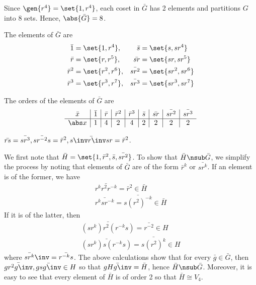 \begin{solenum}
    \item Since $\gen{r^4} = \set{1, r^4}$, each coset in $\bar G$ has 2 elements and partitions $G$ into 8 sets.
	Hence, $\abs{\bar G} = 8$.
    \item The elements of $\bar G$ are
    \begin{align*}
        \bar 1 & = \set{1, r^4}, & \bar{s} & = \set{s, sr^4} \\
        \bar r & = \set{r, r^5}, & \bar{sr} & = \set{sr, sr^5} \\
        \bar r^2 & = \set{r^2, r^6}, & \bar{sr^2} & = \set{sr^2, sr^6} \\
        \bar r^3 & = \set{r^3, r^7}, & \bar{sr^3} & = \set{sr^3, sr^7}
    \end{align*}
    \item The orders of the elements of $\bar G$ are
    \[
        \begin{array}{c|c|c|c|c|c|c|c|c}
            \bar x & \bar 1 & \bar r & \bar r^2 & \bar r^3 & \bar s & \bar{sr} & \bar{sr^2} & \bar{sr^3} \\
            \hline
            \abs x & 1 & 4 & 2 & 4 & 2 & 2 & 2 & 2
        \end{array}
    \]
    \item $\bar{rs} = \bar{sr^3}, \bar{sr^{-2}s} = \bar r^2, \bar{s\inv r\inv sr} = \bar r^2$.
    \item We first note that $\bar H = \set{1, \bar r^2, \bar s, \bar{sr^2}}$.
	To show that $\bar H \nsub \bar G$, we simplify the process by noting that elements of $\bar G$ are of the form $\bar r^k$ or $\bar{sr^k}$.
	If an element is of the former, we have
    \begin{align*}
        \bar{r^kr^2r^{-k}} = \bar r^2 \in \bar H \\
        \bar{r^ksr^{-k}} = \bar{s(r^2)^{-k}} \in \bar H
    \end{align*}
    If it is of the latter, then
    \begin{align*}
        \bar{(sr^k)r^2(r^{-k}s)} = \bar{r^{-2}} \in H \\
        \bar{(sr^k)s(r^{-k}s)} = \bar{s(r^2)^k} \in H
    \end{align*}
    where $\bar{sr^k}\inv = \bar{r^{-k}s}$.
	The above calculations show that for every $\bar g \in \bar G$, then $\bar{gr^2g\inv}, \bar{gsg\inv} \in H$ so that $\bar{gHg\inv} = \bar H$, hence $\bar H \nsub \bar G$.
	Moreover, it is easy to see that every element of $\bar H$ is of order 2 so that $\bar H \cong V_4$.


\end{solenum}
